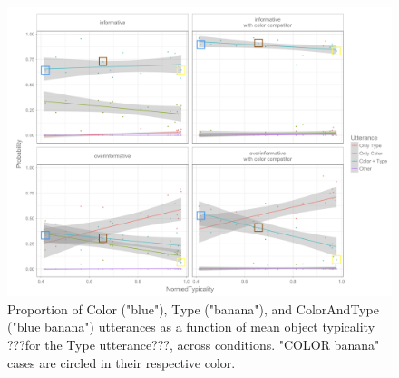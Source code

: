 \documentclass[10pt,letterpaper]{article}
\begin{document}
\begin{figure}[bt]
\centering
\includegraphics[width=.5\textwidth]{graphs/cuny_graph}
\caption{Proportion of Color ("blue"), Type ("banana"), and ColorAndType ("blue banana") utterances as a function of mean object typicality ???for the Type utterance???, across conditions. "COLOR banana" cases are circled in their respective color.}
\label{fig:qualitativemodel}
\end{figure}
\end{document}
